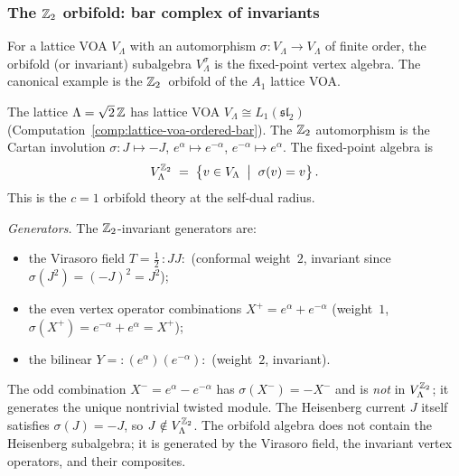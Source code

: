 \subsubsection{The $\mathbb{Z}_2$ orbifold: bar complex of invariants}%
\label{subsubsec:z2-orbifold-bar}%
%
%

For a lattice VOA $V_\Lambda$ with an automorphism
$\sigma\colon V_\Lambda \to V_\Lambda$ of finite order,
the orbifold (or invariant) subalgebra $V_\Lambda^\sigma$ is
the fixed-point vertex algebra. The canonical example is the
$\mathbb{Z}_2$~orbifold of the $A_1$ lattice VOA.

\begin{computation}%
\label{comp:z2-orbifold-ordered-bar}%
%
%
%
%
The lattice $\Lambda = \sqrt{2}\,\mathbb{Z}$ has lattice VOA
$V_\Lambda \cong L_1(\mathfrak{sl}_2)$
(Computation~\ref{comp:lattice-voa-ordered-bar}).
The $\mathbb{Z}_2$ automorphism is the Cartan involution
$\sigma\colon J \mapsto -J$,
$e^\alpha \mapsto e^{-\alpha}$,
$e^{-\alpha} \mapsto e^{\alpha}$.
The fixed-point algebra is
\begin{equation}\label{eq:z2-orbifold-def}
V_\Lambda^{\mathbb{Z}_2}
\;=\;
\bigl\{v \in V_\Lambda \;\bigm|\; \sigma(v) = v\bigr\}\,.
\end{equation}
This is the $c = 1$ orbifold theory at the self-dual radius.

\smallskip
\noindent
\emph{Generators.}
The $\mathbb{Z}_2$-invariant generators are:
\begin{itemize}[nosep]
\item the Virasoro field
 $T = \tfrac{1}{2}\,{:}JJ{:}$
 (conformal weight~$2$, invariant since $\sigma(J^2) = (-J)^2 = J^2$);
\item the even vertex operator combinations
 $X^+ = e^\alpha + e^{-\alpha}$
 (weight~$1$, $\sigma(X^+) = e^{-\alpha} + e^\alpha = X^+$);
\item the bilinear $Y = {:}(e^\alpha)(e^{-\alpha}){:}$
 (weight~$2$, invariant).
\end{itemize}
The odd combination $X^- = e^\alpha - e^{-\alpha}$ has
$\sigma(X^-) = -X^-$ and is \emph{not} in $V_\Lambda^{\mathbb{Z}_2}$;
it generates the unique nontrivial twisted module.
The Heisenberg current $J$ itself satisfies $\sigma(J) = -J$,
so $J \notin V_\Lambda^{\mathbb{Z}_2}$. The orbifold algebra
does not contain the Heisenberg subalgebra; it is generated
by the Virasoro field, the invariant vertex operators, and
their composites.


\end{computation}
